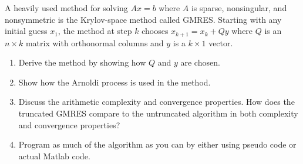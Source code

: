 \documentclass[10pt]{article}
\begin{document}
\begin{problem}
A heavily used method for solving \( Ax = b \) where \( A \) is sparse, nonsingular, and nonsymmetric is the Krylov-space method called GMRES. Starting with any initial guess \( x_1 \), the method at step \( k \) chooses \( x_{k+1} = x_k + Qy \) where \( Q \) is an \( n \times k \) matrix with orthonormal columns and \( y \) is a \( k \times 1 \) vector.
\begin{enumerate}[nolistsep]
\item Derive the method by showing how \( Q \) and \( y \) are chosen.
\item Show how the Arnoldi process is used in the method.
\item Discuss the arithmetic complexity and convergence properties. How does the truncated GMRES compare to the untruncated algorithm in both complexity and convergence properties?
\item Program as much of the algorithm as you can by either using pseudo code or actual Matlab code.
\end{enumerate}

\end{problem}
\end{document}
